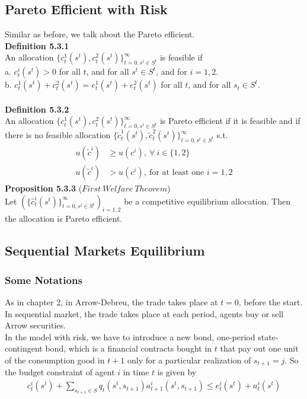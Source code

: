 \documentclass{article}
\begin{document}
\subsection{Pareto Efficient with Risk}
Similar as before, we talk about the Pareto efficient.\\
\textbf{Definition 5.3.1}\\
An allocation $\{c^1_t(s^t), c^2_t(s^t)\}^\infty_{t=0, s^t \in S^t}$ is feasible if\\
\indent a. $c^i_t(s^t) > 0$ for all $t$, and for all $s^t \in S^t$, and for $i = 1, 2$.\\
\indent b. $c^1_t(s^t) + c^2_t(s^t) = e^1_t(s^t) + e^2_t(s^t)$ for all $t$, and for all $s_t \in S^t$.\\\\
\textbf{Definition 5.3.2}\\
An allocation $\{c^1_t(s^t), c^2_t(s^t)\}^\infty_{t=0, s^t \in S^t}$ is Pareto efficient if it is feasible and if there is no feasible allocation $\{\tilde{c}^1_t(s^t), \tilde{c}^2_t(s^t)\}^\infty_{t=0, s^t \in S^t}$ s.t.
\begin{align*}
	u(\tilde{c}^i) &\geq u(c^i),\ \forall\ i \in \{1, 2\}\\
	u(\tilde{c}^i) &> u(c^i),\ \text{for at least one $i = 1, 2$}
\end{align*}
\textbf{Proposition 5.3.3} ($First\ Welfare\ Theorem$)\\
Let $(\{\hat{c}^i_t(s^t)\}^\infty_{t=0, s^t \in S^t})_{i=1,2}$ be a competitive equilibrium allocation. Then the allocation is Pareto efficient.


\subsection{Sequential Markets Equilibrium}
\subsubsection{Some Notations}
As in chapter 2, in Arrow-Debreu, the trade takes place at $t = 0$, before the start. In sequential market, the trade takes place at each period, agents buy or sell Arrow securities.\\
In the model with risk, we have to introduce a new bond, one-period state-contingent bond, which is a financial contracts bought in $t$ that pay out one unit of the consumption good in $t+1$ only for a particular realization of $s_{t+1} = j$. So the budget constraint of agent $i$ in time $t$ is given by
\begin{align*}
	c^i_t(s^t) + \sum\limits_{s_{t+1} \in S} q_t(s^t, s_{t+1}) a^i_{t+1}(s^t, s_{t+1}) \leq e^i_t(s^t) + a^i_t(s^t)
\end{align*}
\end{document}
